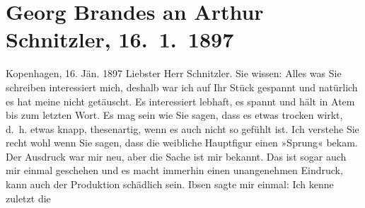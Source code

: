 

               \section[Georg Brandes an Arthur Schnitzler, 16. 1. 1897]{ Georg Brandes an Arthur Schnitzler, 16. 1. 1897}\nopagebreak{}\rehead{ }\begin{ledgroupsized}[t]{13cm}\normalsize\beginnumbering{} \toendnotes[C]{\smallbreak\pagebreak[2]} 
\toendnotes[C]{\smallbreak}\pstart
           \raggedleft{}{\pb}Kopenhagen, 16.{ }Jän.{ }1897\pend
           \pstart\center{}Liebster Herr Schnitzler.\pend\pstart
           Sie wissen: Alles was Sie schreiben interessiert mich, deshalb war ich auf Ihr Stück gespannt und natürlich es
               hat meine \label{T_L00639_1v}\label{T_L00639_1h} nicht getäuscht. Es interessiert lebhaft, es
               spannt und hält in Atem bis zum letzten Wort.\pend
           \pstart
           Es mag sein wie Sie sagen, dass es etwas trocken wirkt, d. h. etwas knapp,
               thesenartig, wenn es auch nicht so gefühlt ist. Ich verstehe Sie recht wohl wenn Sie
               sagen, dass die weibliche Hauptfigur einen »Sprung« bekam. Der Ausdruck war mir neu,
               aber die Sache ist mir bekannt. Das ist sogar auch mir einmal geschehen und es macht
               immerhin einen unangenehmen Eindruck, kann auch der Produktion schädlich sein. Ibsen sagte mir einmal: Ich kenne zuletzt die

\end{ledgroupsized}
